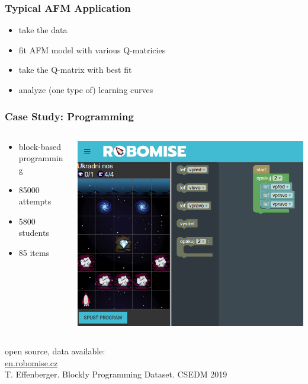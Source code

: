 \documentclass[bigger]{beamer}
\begin{document}
\begin{frame}
  \frametitle{Typical AFM Application}

  \begin{itemize}
  \item take the data
  \item fit AFM model with various Q-matricies
  \item take the Q-matrix with best fit
  \item analyze (one type of) learning curves
  \end{itemize}
\end{frame}

\begin{frame}
  \frametitle{Case Study: Programming}

  \begin{columns}
    \begin{column}{0.5\linewidth}
  \begin{itemize}
  \item block-based programming
  \item 85000 attempts
  \item 5800 students
  \item 85 items
  \end{itemize}      
    \end{column}
    \begin{column}{0.5\linewidth}
  \begin{center}
    \includegraphics[width=\linewidth]{robomise}
  \end{center}      
    \end{column}
  \end{columns}

  \bigskip
  open source, data available:\\
  \url{en.robomise.cz} \\
  T. Effenberger. Blockly Programming Dataset. CSEDM 2019
\end{frame}
\end{document}
